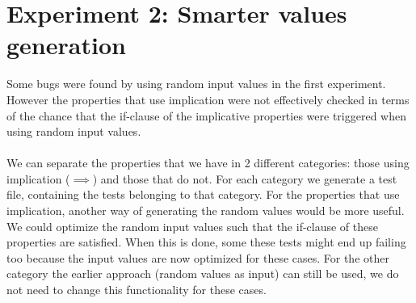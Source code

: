 \chapter{Experiment 2: Smarter values generation}
\label{chp:experiment2}
Some bugs were found by using random input values in the first experiment. However the properties that use implication were not effectively checked in terms of the chance that the if-clause of the implicative properties were triggered when using random input values.\\
\\
We can separate the properties that we have in 2 different categories: those using implication ($\implies$) and those that do not. For each category we generate a test file, containing the tests belonging to that category. For the properties that use implication, another way of generating the random values would be more useful. We could optimize the random input values such that the if-clause of these properties are satisfied. When this is done, some these tests might end up failing too because the input values are now optimized for these cases. For the other category the earlier approach (random values as input) can still be used, we do not need to change this functionality for these cases.

